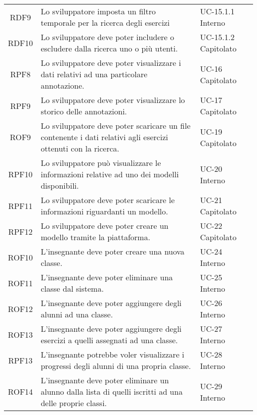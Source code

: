 \begin{tabularx}{\textwidth}{| c | p{10cm} | X |}
		RDF9 & Lo sviluppatore imposta un filtro temporale per la ricerca degli esercizi & UC-15.1.1 \newline Interno\\
		RDF10 &  Lo sviluppatore deve poter includere o escludere dalla ricerca uno o più utenti. & UC-15.1.2 \newline Capitolato\\
		RPF8 & Lo sviluppatore deve poter visualizzare i dati relativi ad una particolare annotazione. & UC-16 \newline Capitolato\\
		RPF9 & Lo sviluppatore deve poter visualizzare lo storico delle annotazioni. & UC-17 \newline Capitolato\\
		ROF9 & Lo sviluppatore deve poter scaricare un file contenente i dati relativi agli esercizi ottenuti con la ricerca. & UC-19 \newline Capitolato\\
		RPF10 & Lo sviluppatore può visualizzare le informazioni relative ad uno dei modelli disponibili. & UC-20 \newline Interno\\
		RPF11 & Lo sviluppatore deve poter scaricare le informazioni riguardanti un modello. & UC-21 \newline Capitolato\\
		RPF12 & Lo sviluppatore deve poter creare un modello tramite la piattaforma. & UC-22 \newline Capitolato\\ 
		ROF10 & L'insegnante deve poter creare una nuova classe. & UC-24 \newline Interno\\
		ROF11 & L'insegnante deve poter eliminare una classe dal sistema. & UC-25 \newline Interno\\
		ROF12 & L'insegnante deve poter aggiungere degli alunni ad una classe. & UC-26 \newline Interno\\
		ROF13 & L'insegnante deve poter aggiungere degli esercizi a quelli assegnati ad una classe. & UC-27 \newline Interno\\
		RPF13 & L'insegnante potrebbe voler visualizzare i progressi degli alunni di una propria classe. & UC-28 \newline Interno\\
		ROF14 & L'insegnante deve poter eliminare un alunno dalla lista di quelli iscritti ad una delle proprie classi. & UC-29 \newline Interno\\

\end{tabularx}
